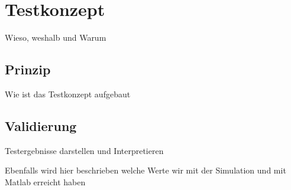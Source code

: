 \section{Testkonzept}\label{sec:testkonzept}
Wieso, weshalb und Warum
\subsection{Prinzip} \label{prinzip}
Wie ist das Testkonzept aufgebaut
\subsection{Validierung} \label{validierung}
Testergebnisse darstellen und Interpretieren

Ebenfalls wird hier beschrieben welche Werte wir mit der Simulation und mit Matlab erreicht haben
